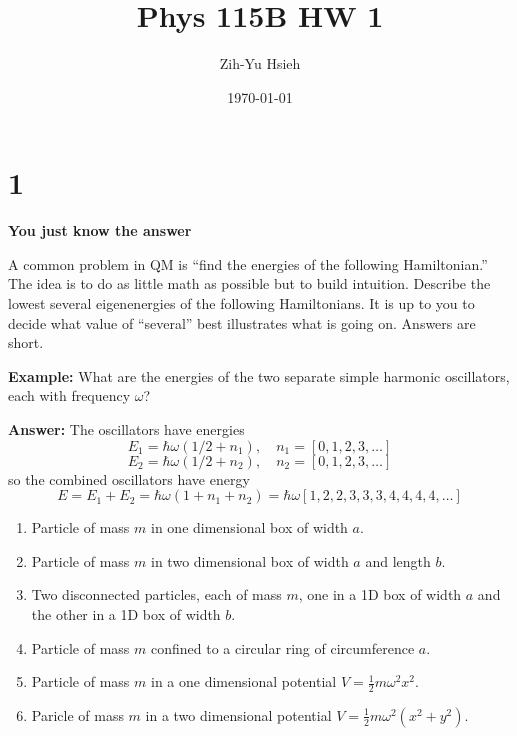 \documentclass{article}
\title{Phys 115B HW 1}
\author{Zih-Yu Hsieh}
\date{\today}
\begin{document}
\maketitle

\section*{1}

\begin{ques}\label{q1}
\textbf{You just know the answer}

A common problem in QM is ``find the energies of the following Hamiltonian.'' The idea
is to do as little math as possible but to build intuition. Describe the lowest several
eigenenergies of the following Hamiltonians. It is up to you to decide what value of ``several''
best illustrates what is going on. Answers are short.

\textbf{Example:} What are the energies of the two separate simple harmonic oscillators, each
with frequency $\omega$?

\textbf{Answer:} The oscillators have energies
\[
E_1 = \hbar\omega(1/2 + n_1), \quad n_1 = [0,1,2,3,\ldots]
\]
\[
E_2 = \hbar\omega(1/2 + n_2), \quad n_2 = [0,1,2,3,\ldots]
\]
so the combined oscillators have energy
\[
E = E_1 + E_2 = \hbar\omega(1 + n_1 + n_2)
= \hbar\omega[1,2,2,3,3,3,4,4,4,4,\ldots]
\]

\begin{enumerate}
\item Particle of mass $m$ in one dimensional box of width $a$.
\item Particle of mass $m$ in two dimensional box of width $a$ and length $b$.
\item Two disconnected particles, each of mass $m$, one in a 1D box of width $a$ and the
other in a 1D box of width $b$.
\item Particle of mass $m$ confined to a circular ring of circumference $a$.
\item Particle of mass $m$ in a one dimensional potential $V = \frac{1}{2}m\omega^2 x^2$.
\item Paricle of mass $m$ in a two dimensional potential
$V = \frac{1}{2}m\omega^2(x^2 + y^2)$.
\end{enumerate}
\end{ques}
\end{document}
